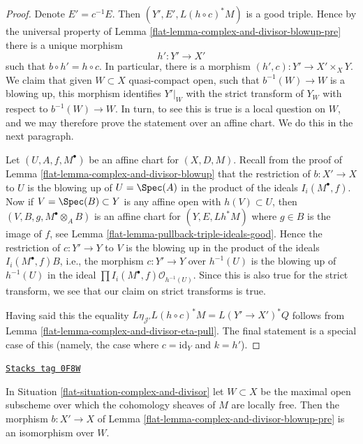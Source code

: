 \begin{proof}

Denote $E' = c^{-1}E$. Then $(Y', E', L(h \circ c)^*M)$ is a good
triple. Hence by the universal property of
Lemma \ref{flat-lemma-complex-and-divisor-blowup-pre}
there is a unique morphism
$$
h' : Y' \longrightarrow X'
$$
such that $b \circ h' = h \circ c$. In particular, there is a morphism
$(h', c) : Y' \to X' \times_X Y$. We claim that given $W \subset X$
quasi-compact open, such that $b^{-1}(W) \to W$ is a blowing up,
this morphism identifies $Y'|_W$ with the strict transform of $Y_W$
with respect to $b^{-1}(W) \to W$. In turn, to see this is true
is a local question on $W$, and we may therefore prove the
statement over an affine chart. We do this in the next paragraph.

\medskip\noindent
Let $(U, A, f, M^\bullet)$ be an affine chart for $(X, D, M)$.
Recall from the proof of Lemma \ref{flat-lemma-complex-and-divisor-blowup}
that the restriction of $b : X' \to X$ to $U$ is the blowing
up of $U = \Spec(A)$ in the product of the ideals $I_i(M^\bullet, f)$.
Now if $V = \Spec(B) \subset Y$ is any affine open with $h(V) \subset U$,
then $(V, B, g, M^\bullet \otimes_A B)$ is an affine chart for
$(Y, E, Lh^*M)$ where $g \in B$ is the image of $f$, see
Lemma \ref{flat-lemma-pullback-triple-ideals-good}.
Hence the restriction of $c : Y' \to Y$ to $V$
is the blowing up in the product of the ideals
$I_i(M^\bullet, f)B$, i.e., the morphism $c : Y' \to Y$ over
$h^{-1}(U)$ is the blowing up of $h^{-1}(U)$ in the
ideal $\prod I_i(M^\bullet, f) \mathcal{O}_{h^{-1}(U)}$.
Since this is also true for the strict transform, we see that
our claim on strict transforms is true.

\medskip\noindent
Having said this the equality
$L\eta_{\mathcal{J}'}L(h \circ c)^*M = L(Y' \to X')^*Q$
follows from
Lemma \ref{flat-lemma-complex-and-divisor-eta-pull}.
The final statement is a special case of this
(namely, the case where $c = \text{id}_Y$ and $k = h'$).
\end{proof}

\begin{lemma}
\label{flat-lemma-complex-and-divisor-blowup-good}
\href{https://stacks.math.columbia.edu/tag/0F8W}{\texttt{Stacks tag 0F8W}}

In Situation \ref{flat-situation-complex-and-divisor} let $W \subset X$
be the maximal open subscheme over which the cohomology sheaves
of $M$ are locally free. Then the morphism $b : X' \to X$
of Lemma \ref{flat-lemma-complex-and-divisor-blowup-pre} is an isomorphism
over $W$.
\end{lemma}

